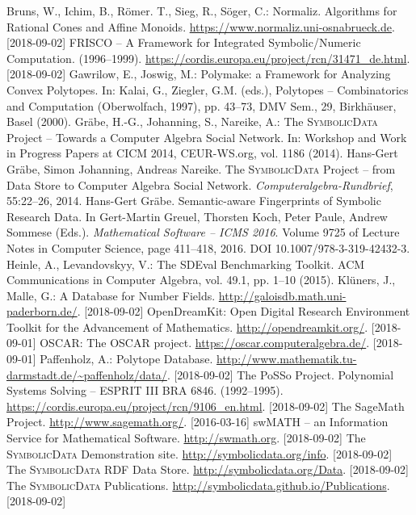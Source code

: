 \documentclass[a4paper,11pt]{article}
\def\SD{\textsc{SymbolicData}}
\begin{document}
\begin{thebibliography}{xxx}\raggedright
{} Bruns, W., Ichim, B., R\"omer. T., Sieg, R., S\"oger, C.:
  Normaliz. Algorithms for Rational Cones and Affine Monoids.
  \url{https://www.normaliz.uni-osnabrueck.de}. [2018-09-02]
 FRISCO -- A Framework for Integrated Symbolic/Numeric
  Computation. (1996--1999).
  \url{https://cordis.europa.eu/project/rcn/31471_de.html}.  [2018-09-02]
 Gawrilow, E., Joswig, M.: Polymake: a Framework for
  Analyzing Convex Polytopes. In: Kalai, G., Ziegler, G.M. (eds.), Polytopes --
  Combinatorics and Computation (Oberwolfach, 1997), pp. 43--73, DMV Sem., 29,
  Birkh\"auser, Basel (2000). 
 Gr\"abe, H.-G., Johanning, S., Nareike, A.: The {\SD} Project
  -- Towards a Computer Algebra Social Network. In: Workshop and Work in
  Progress Papers at CICM 2014, CEUR-WS.org, vol. 1186 (2014).
 Hans-Gert Gr\"abe, Simon Johanning, Andreas Nareike.
  \newblock The {\SD} Project -- from Data Store to Computer Algebra Social
  Network. \newblock \emph{Computeralgebra-Rundbrief}, 55:22--26, 2014.
 Hans-Gert Gr\"abe. \newblock Semantic-aware Fingerprints of
  Symbolic Research Data. \newblock In Gert-Martin Greuel, Thorsten Koch, Peter
  Paule, Andrew Sommese (Eds.).  \emph{Mathematical Software -- ICMS 2016}.
  \newblock Volume 9725 of Lecture Notes in Computer Science, page 411--418,
  2016.  \newblock DOI 10.1007/978-3-319-42432-3.
 Heinle, A., Levandovskyy, V.: The SDEval Benchmarking
  Toolkit. ACM Communications in Computer Algebra, vol. 49.1, pp. 1--10 (2015).
 Kl\"uners, J., Malle, G.: A Database for Number Fields.
  \url{http://galoisdb.math.uni-paderborn.de/}. [2018-09-02]
 OpenDreamKit: Open Digital Research Environment Toolkit for the
  Advancement of Mathematics. \url{http://opendreamkit.org/}. [2018-09-01]
 OSCAR: The OSCAR project.
  \url{https://oscar.computeralgebra.de/}.  [2018-09-01]
 Paffenholz, A.: Polytope Database.
  \url{http://www.mathematik.tu-darmstadt.de/~paffenholz/data/}.  [2018-09-02] 
 The PoSSo Project. Polynomial Systems Solving -- ESPRIT III BRA
  6846.  (1992--1995).
  \url{https://cordis.europa.eu/project/rcn/9106_en.html}.  [2018-09-02]
 The SageMath Project.  \url{http://www.sagemath.org/}.
  [2016-03-16]
 swMATH -- an Information Service for Mathematical Software.
  \newblock \url{http://swmath.org}. [2018-09-02]
 The {\SD} Demonstration site.
  \url{http://symbolicdata.org/info}.  [2018-09-02]
 The {\SD} RDF Data Store.
  \url{http://symbolicdata.org/Data}.  [2018-09-02]
 The {\SD} Publications.
  \url{http://symbolicdata.github.io/Publications}.  [2018-09-02]
\end{thebibliography}
\end{document}
